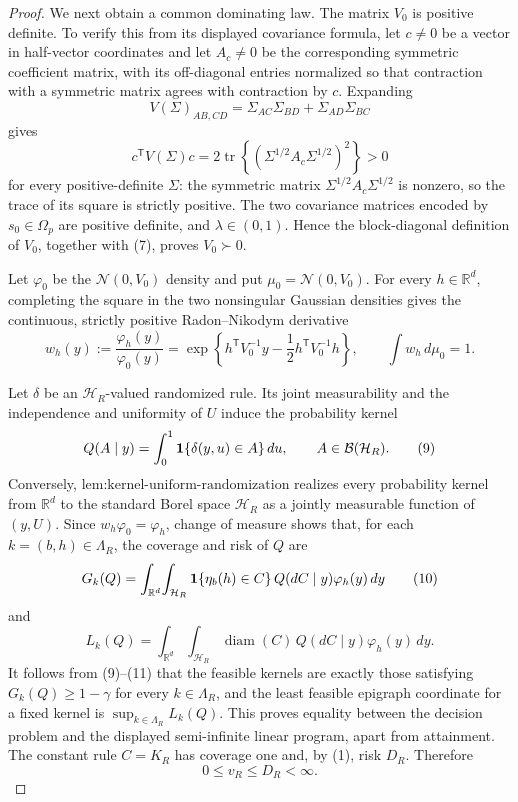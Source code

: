 \documentclass{article}
\begin{document}
\begin{proof}
We next obtain a common dominating law.  The matrix \(V_0\) is positive definite.  To verify this from its displayed covariance formula, let \(c\ne0\) be a vector in half-vector coordinates and let \(A_c\ne0\) be the corresponding symmetric coefficient matrix, with its off-diagonal entries normalized so that contraction with a symmetric matrix agrees with contraction by \(c\).  Expanding
\[
 V(\Sigma)_{AB,CD}=\Sigma_{AC}\Sigma_{BD}+\Sigma_{AD}\Sigma_{BC}
\]
gives
\[
 c^{\mathsf T}V(\Sigma)c
 =2\operatorname{tr}\!\left\{(\Sigma^{1/2}A_c\Sigma^{1/2})^2\right\}>0
\tag{7}
\]
for every positive-definite \(\Sigma\): the symmetric matrix \(\Sigma^{1/2}A_c\Sigma^{1/2}\) is nonzero, so the trace of its square is strictly positive.  The two covariance matrices encoded by \(s_0\in\Omega_p\) are positive definite, and \(\lambda\in(0,1)\).  Hence the block-diagonal definition of \(V_0\), together with (7), proves \(V_0\succ0\).

Let \(\varphi_0\) be the \(\mathcal N(0,V_0)\) density and put \(\mu_0=\mathcal N(0,V_0)\).  For every \(h\in\mathbb R^d\), completing the square in the two nonsingular Gaussian densities gives the continuous, strictly positive Radon--Nikodym derivative
\[
 w_h(y):=\frac{\varphi_h(y)}{\varphi_0(y)}
 =\exp\!\left\{h^{\mathsf T}V_0^{-1}y
 -\frac12h^{\mathsf T}V_0^{-1}h\right\},
 \qquad
 \int w_h\,d\mu_0=1.
\tag{8}
\]

Let \(\delta\) be an \(\mathcal H_R\)-valued randomized rule.  Its joint measurability and the independence and uniformity of \(U\) induce the probability kernel
\[
 Q(A\mid y)=\int_0^1{\bf1}\{\delta(y,u)\in A\}\,du,
 \qquad A\in\mathcal B(\mathcal H_R).
\tag{9}
\]
Conversely, \(\text{lem:kernel-uniform-randomization}\) realizes every probability kernel from \(\mathbb R^d\) to the standard Borel space \(\mathcal H_R\) as a jointly measurable function of \((y,U)\).  Since \(w_h\varphi_0=\varphi_h\), change of measure shows that, for each \(k=(b,h)\in\Lambda_R\), the coverage and risk of \(Q\) are
\[
 G_k(Q)=\int_{\mathbb R^d}\!\int_{\mathcal H_R}
 {\bf1}\{\eta_b(h)\in C\}\,Q(dC\mid y)\varphi_h(y)\,dy
\tag{10}
\]
and
\[
 L_k(Q)=\int_{\mathbb R^d}\!\int_{\mathcal H_R}
 \operatorname{diam}(C)\,Q(dC\mid y)\varphi_h(y)\,dy.
\tag{11}
\]
It follows from (9)--(11) that the feasible kernels are exactly those satisfying \(G_k(Q)\ge1-\gamma\) for every \(k\in\Lambda_R\), and the least feasible epigraph coordinate for a fixed kernel is \(\sup_{k\in\Lambda_R}L_k(Q)\).  This proves equality between the decision problem and the displayed semi-infinite linear program, apart from attainment.  The constant rule \(C=K_R\) has coverage one and, by (1), risk \(D_R\).  Therefore
\[
 0\le v_R\le D_R<\infty.
\tag{12}
\]


\end{proof}
\end{document}
